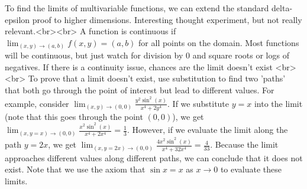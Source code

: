 To find the limits of multivariable functions, we can extend the standard delta-epsilon proof to higher dimensions. Interesting thought experiment, but not really relevant.<br><br>
A function is continuous if $\lim_{(x, y) \to (a, b)}f(x, y) = (a, b)$ for all points on the domain. Most functions will be continuous, but just watch for division by 0 and square roots or logs of negatives. If there is a continuity issue, chances are the limit doesn't exist <br><br>
To prove that a limit doesn't exist, use substitution to find two 'paths' that both go through the point of interest but lead to different values. For example, consider $\lim_{(x, y) \to (0, 0)}\frac{y^2\sin^2(x)}{x^4+2y^4}$. If we substitute $y=x$ into the limit (note that this goes through the point $(0, 0)$), we get $\lim_{(x, y=x) \to (0, 0)}\frac{x^2\sin^2(x)}{x^4+2x^4} = \frac{1}{3}$. However, if we evaluate the limit along the path $y=2x$, we get $\lim_{(x, y=2x) \to (0, 0)}\frac{4x^2\sin^2(x)}{x^4+32x^4} = \frac{4}{33}$. Because the limit approaches different values along different paths, we can conclude that it does not exist. Note that we use the axiom that $\sin x = x$ as $ x \to 0$ to evaluate these limits.

